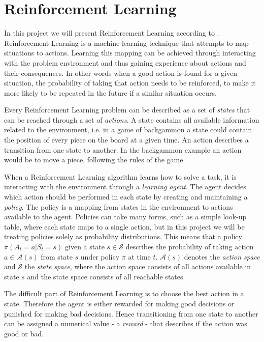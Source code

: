 \documentclass[11pt]{article}
\begin{document}
\maketitle

\section{Reinforcement Learning}

In this project we will present Reinforcement Learning according to
\cite{RLbook}.
Reinforcement Learning is a machine learning technique that attempts 
to map situations to actions.
Learning this mapping can be achieved through interacting with the problem
environment and thus gaining experience about actions and their consequences.
In other words when a good action is found for a given situation,
the probability of taking that action needs to be reinforced,
to make it more likely to be
repeated in the future if a similar situation occurs.

Every Reinforcement Learning problem can be described as a set of \textit{states} that can be reached
through a set of \textit{actions}.
A state contains all available information related to the environment,
i.e. in a game of backgammon a state could contain the position of every piece on the board at
a given time.
An action describes a transition from one state to another.
In the backgammon example an action would be to move a piece, following the rules of the
game.

When a Reinforcement Learning algorithm learns how to solve a task, it is
interacting with the environment through a \textit{learning agent}.
The agent decides which action should be performed in each state by creating and maintaining a \textit{policy}.
The policy is a mapping from states in the environment to actions available to the agent.
Policies can take many forms, such as a simple look-up table, where each state maps to a single
action, but in this project we will be treating policies solely as probability distributions.
This means that a policy $\pi(A_t = a|S_t = s)$ given a state $s \in \mathcal{S}$ describes the
probability of taking action $a \in \mathcal{A}(s)$ from state $s$ under policy $\pi$ at time $t$.
$\mathcal{A}(s)$ denotes the \textit{action space} and $\mathcal{S}$ the \textit{state space},
where the action space consists of all actions available in state $s$ and the state space consists of
all reachable states.

The difficult part of Reinforcement Learning is to choose the best action in a
state.
Therefore the agent is either rewarded for making good decisions or punished for making bad decisions.
Hence transitioning from one state to another can be assigned a numerical value
- a \textit{reward} - that describes if the action was good or bad.
\end{document}
